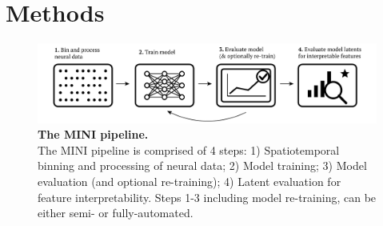\section{Methods}

\begin{figure}[h]
    \centering
    \includegraphics[width=\linewidth]{figures/mini_pipeline.pdf}
    \caption{
        \textbf{The MINI pipeline.} \\
        \small The MINI pipeline is comprised of 4 steps: 1) Spatiotemporal binning and processing of neural data; 2) Model training; 3) Model evaluation (and optional re-training); 4) Latent evaluation for feature interpretability. Steps 1-3 including model re-training, can be either semi- or fully-automated.
    }
    \label{fig:mini_pipeline}
\end{figure}

